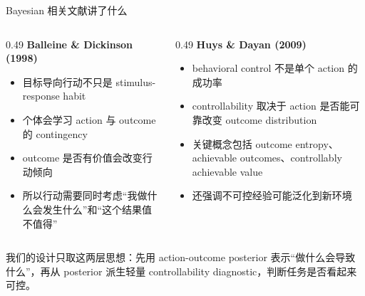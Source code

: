 \documentclass[aspectratio=169]{beamer}
\begin{document}
\begin{frame}[t]{Bayesian 相关文献讲了什么}
\small
\begin{columns}[T]
\begin{column}{0.49\textwidth}
\textbf{Balleine \& Dickinson (1998)}
\begin{itemize}
    \item 目标导向行动不只是 stimulus-response habit
    \item 个体会学习 action 与 outcome 的 contingency
    \item outcome 是否有价值会改变行动倾向
    \item 所以行动需要同时考虑“我做什么会发生什么”和“这个结果值不值得”
\end{itemize}
\end{column}

\begin{column}{0.49\textwidth}
\textbf{Huys \& Dayan (2009)}
\begin{itemize}
    \item behavioral control 不是单个 action 的成功率
    \item controllability 取决于 action 是否能可靠改变 outcome distribution
    \item 关键概念包括 outcome entropy、achievable outcomes、controllably achievable value
    \item 还强调不可控经验可能泛化到新环境
\end{itemize}
\end{column}
\end{columns}

\vspace{0.20cm}
\begin{minipage}{0.92\textwidth}
\justifying
我们的设计只取这两层思想：先用 action-outcome posterior 表示“做什么会导致什么”，再从 posterior 派生轻量 controllability diagnostic，判断任务是否看起来可控。
\end{minipage}
\end{frame}
\end{document}
